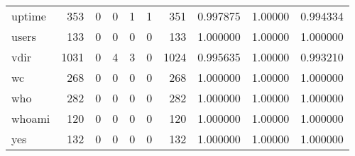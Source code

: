 \begin{longtable}{lrrrrrrrrr}
uptime    &                    353 &                                  0 &                                 0 &                                1 &                                 1 &                             351 &                                0.997875 &                                1.00000 &                             0.994334 \\
users     &                    133 &                                  0 &                                 0 &                                0 &                                 0 &                             133 &                                1.000000 &                                1.00000 &                             1.000000 \\
vdir      &                   1031 &                                  0 &                                 4 &                                3 &                                 0 &                            1024 &                                0.995635 &                                1.00000 &                             0.993210 \\
wc        &                    268 &                                  0 &                                 0 &                                0 &                                 0 &                             268 &                                1.000000 &                                1.00000 &                             1.000000 \\
who       &                    282 &                                  0 &                                 0 &                                0 &                                 0 &                             282 &                                1.000000 &                                1.00000 &                             1.000000 \\
whoami    &                    120 &                                  0 &                                 0 &                                0 &                                 0 &                             120 &                                1.000000 &                                1.00000 &                             1.000000 \\
yes       &                    132 &                                  0 &                                 0 &                                0 &                                 0 &                             132 &                                1.000000 &                                1.00000 &                             1.000000 \\
\end{longtable}
